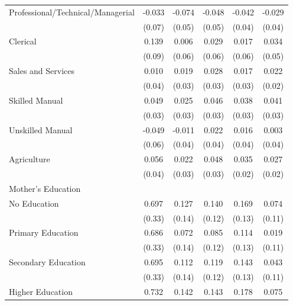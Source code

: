 \begin{longtable}{l*{5}{c}}
\hspace{1em}Professional/Technical/Managerial & -0.033 & -0.074 & -0.048 & -0.042 & -0.029 \\
                    & (0.07) & (0.05) & (0.05) & (0.04) & (0.04) \\
\hspace{1em}Clerical & 0.139 & 0.006 & 0.029 & 0.017 & 0.034 \\
                    & (0.09) & (0.06) & (0.06) & (0.06) & (0.05) \\
\hspace{1em}Sales and Services & 0.010 & 0.019 & 0.028 & 0.017 & 0.022 \\
                    & (0.04) & (0.03) & (0.03) & (0.03) & (0.02) \\
\hspace{1em}Skilled Manual & 0.049 & 0.025 & 0.046 & 0.038 & 0.041 \\
                    & (0.03) & (0.03) & (0.03) & (0.03) & (0.03) \\
\hspace{1em}Unskilled Manual & -0.049 & -0.011 & 0.022 & 0.016 & 0.003 \\
                    & (0.06) & (0.04) & (0.04) & (0.04) & (0.04) \\
\hspace{1em}Agriculture & 0.056 & 0.022 & 0.048\sym{*} & 0.035 & 0.027 \\
                    & (0.04) & (0.03) & (0.03) & (0.02) & (0.02) \\
\multicolumn{6}{l}{Mother's Education} \\
\hspace{1em}No Education & 0.697\sym{**} & 0.127 & 0.140 & 0.169 & 0.074 \\
                    & (0.33) & (0.14) & (0.12) & (0.13) & (0.11) \\
\hspace{1em}Primary Education & 0.686\sym{**} & 0.072 & 0.085 & 0.114 & 0.019 \\
                    & (0.33) & (0.14) & (0.12) & (0.13) & (0.11) \\
\hspace{1em}Secondary Education & 0.695\sym{**} & 0.112 & 0.119 & 0.143 & 0.043 \\
                    & (0.33) & (0.14) & (0.12) & (0.13) & (0.11) \\
\hspace{1em}Higher Education & 0.732\sym{**} & 0.142 & 0.143 & 0.178 & 0.075 \\

\end{longtable}
